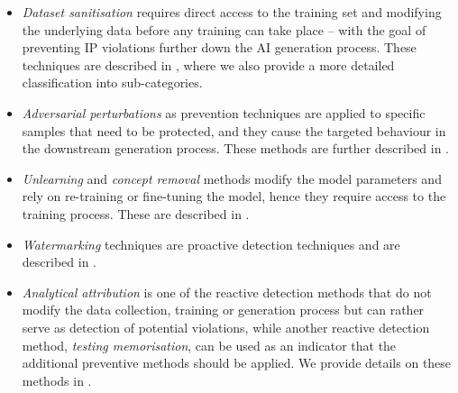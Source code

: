 \documentclass[conference,table]{IEEEtran} %
\begin{document}


 


\begin{itemize}
    \item \textit{Dataset sanitisation} requires direct access to the training set and modifying the underlying data before any training can take place -- with the goal of preventing IP violations further down the AI generation process.
    These techniques are described in , where we also provide a more detailed classification into sub-categories. 
    \item \textit{Adversarial perturbations} as prevention techniques are applied to specific samples that need to be protected, and they cause the targeted behaviour in the downstream generation process. These methods are further described in .
    \item \textit{Unlearning} and \textit{concept removal} methods modify the model parameters and rely on re-training or fine-tuning the model, hence they require access to the training process. These are described in .
    \item \textit{Watermarking} techniques are proactive detection techniques and are described in .
    \item \textit{Analytical attribution} is one of the reactive detection methods that do not modify the data collection, training or generation process but can rather serve as detection of potential violations, while another reactive detection method, \textit{testing memorisation}, can be used as an indicator that the additional preventive methods should be applied. We provide details on these methods in .
\end{itemize}

\end{document}
